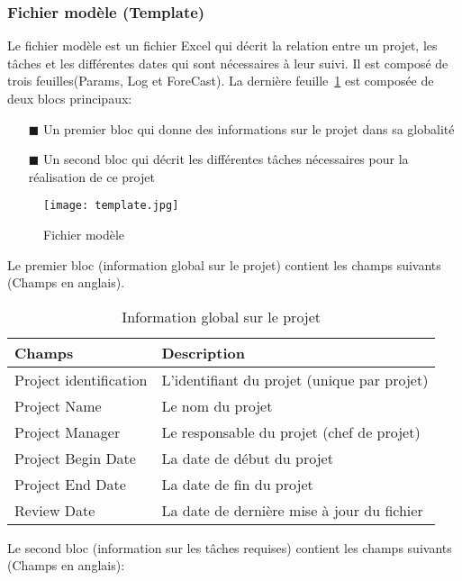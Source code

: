 \subsubsection*{Fichier modèle (Template)}
Le fichier modèle est un fichier Excel qui décrit la relation entre un projet, les tâches et les différentes dates qui sont nécessaires à leur suivi. Il est composé de trois feuilles(Params, Log et ForeCast). La dernière feuille~\ref{template} est composée de deux blocs principaux: 
\begin{itemize}
\item[\tiny{$\blacksquare$}]Un premier bloc qui donne des informations sur le projet dans sa globalité
\item[\tiny{$\blacksquare$}]Un second bloc qui décrit les différentes tâches nécessaires pour la réalisation de ce projet
\end{itemize}
\begin{figure}[h]
\centering
\texttt{[image: template.jpg]}
\caption{\label{template}Fichier modèle}
\end{figure}
Le premier bloc (information global sur le projet) contient les champs suivants (Champs en anglais).\\
\begin{table}[h]
\centering
\begin{tabular}{|p{5cm}|m{10cm}|}
\hline Champs & Description \tabularnewline
\hline Project identification & L'identifiant du projet (unique par projet) \tabularnewline
\hline Project Name & Le nom du projet \tabularnewline
\hline Project Manager & Le responsable du projet (chef de projet) \tabularnewline
\hline Project Begin Date & La date de début du projet \tabularnewline
\hline Project End Date & La date de fin du projet \tabularnewline
\hline Review Date & La date de dernière mise à jour du fichier \tabularnewline
\hline
\end{tabular}
\caption{\label{bloc1}Information global sur le projet}
\end{table}
\clearpage
Le second bloc (information sur les tâches requises) contient les champs suivants (Champs en anglais):
